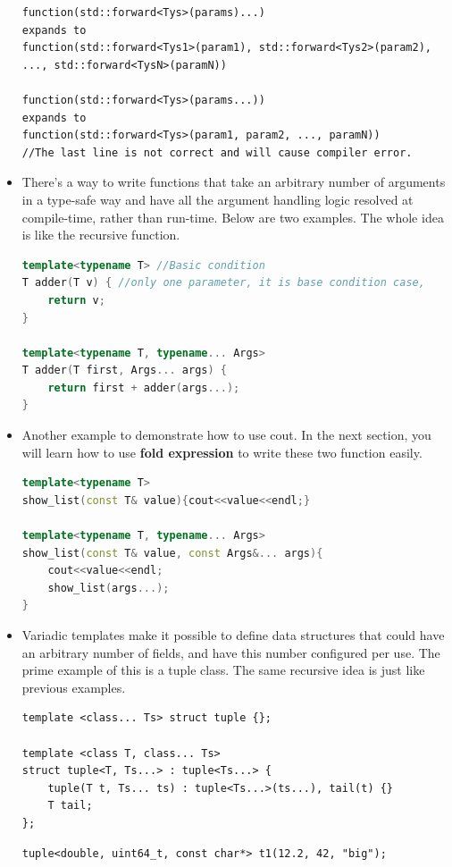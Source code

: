 \documentclass[a4paper,11pt,twoside]{book}
\begin{document}
\begin{itemize}
\begin{lstlisting}
function(std::forward<Tys>(params)...)
expands to
function(std::forward<Tys1>(param1), std::forward<Tys2>(param2), ..., std::forward<TysN>(paramN))

function(std::forward<Tys>(params...))
expands to
function(std::forward<Tys>(param1, param2, ..., paramN))
//The last line is not correct and will cause compiler error.
\end{lstlisting}

    \item There's a way to write functions that take an arbitrary number of arguments in a type-safe way and have all the argument handling logic resolved at compile-time, rather than run-time. Below are two examples. The whole idea is like the recursive function.

\begin{lstlisting}[frame=single, language=c++]
template<typename T> //Basic condition
T adder(T v) { //only one parameter, it is base condition case,
	return v;
}

template<typename T, typename... Args>
T adder(T first, Args... args) {
	return first + adder(args...);
}
\end{lstlisting}

    \item Another example to demonstrate how to use cout. In the next section, you will learn how to use \textbf{fold expression} to write these two function easily.
\begin{lstlisting}[frame=single, language=c++]
template<typename T>
show_list(const T& value){cout<<value<<endl;}

template<typename T, typename... Args>
show_list(const T& value, const Args&... args){
	cout<<value<<endl;
	show_list(args...);
}
\end{lstlisting}

    \item Variadic templates make it possible to define data structures that could have an arbitrary number of fields, and have this number configured per use. The prime example of this is a tuple class. The same recursive idea is just like previous examples.
\begin{lstlisting}
template <class... Ts> struct tuple {};

template <class T, class... Ts>
struct tuple<T, Ts...> : tuple<Ts...> {
	tuple(T t, Ts... ts) : tuple<Ts...>(ts...), tail(t) {}
	T tail;
};
\end{lstlisting}


\begin{lstlisting}
tuple<double, uint64_t, const char*> t1(12.2, 42, "big");


\end{lstlisting}
\end{itemize}
\end{document}
